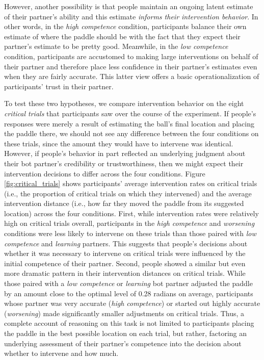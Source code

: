 \documentclass[10pt,letterpaper]{article}
\begin{document}
However, another possibility is that people maintain an ongoing latent estimate of their partner's ability and this estimate \textit{informs their intervention behavior}. In other words, in the \textit{high competence} condition, participants balance their own estimate of where the paddle should be with the fact that they expect their partner's estimate to be pretty good. Meanwhile, in the \textit{low competence} condition, participants are accustomed to making large interventions on behalf of their partner and therefore place less confidence in their partner's estimates even when they are fairly accurate. This latter view offers a basic operationalization of participants' trust in their partner.

To test these two hypotheses, we compare intervention behavior on the eight \textit{critical trials} that participants saw over the course of the experiment. If people's responses were merely a result of estimating the ball's final location and placing the paddle there, we should not see any difference between the four conditions on these trials, since the amount they would have to intervene was identical. However, if people's behavior in part reflected an underlying judgment about their bot partner's credibility or trustworthiness, then we might expect their intervention decisions to differ across the four conditions. Figure \ref{fig:critical_trials} shows participants' average intervention rates on critical trials (i.e., the proportion of critical trials on which they intervened) and the average intervention distance (i.e., how far they moved the paddle from its suggested location) across the four conditions. First, while intervention rates were relatively high on critical trials overall, participants in the \textit{high competence} and \textit{worsening} conditions were less likely to intervene on these trials than those paired with \textit{low competence} and \textit{learning} partners. This suggests that people's decisions about whether it was necessary to intervene on critical trials were influenced by the initial competence of their partner. Second, people showed a similar but even more dramatic pattern in their intervention distances on critical trials. While those paired with a \textit{low competence} or \textit{learning} bot partner adjusted the paddle by an amount close to the optimal level of 0.28 radians on average, participants whose partner was very accurate (\textit{high competence}) or started out highly accurate (\textit{worsening}) made significantly smaller adjustments on critical trials. Thus, a complete account of  reasoning on this task is not limited to participants placing the paddle in the best possible location on each trial, but rather, factoring an underlying assessment of their partner's competence into the decision about whether to intervene and how much.
\end{document}
